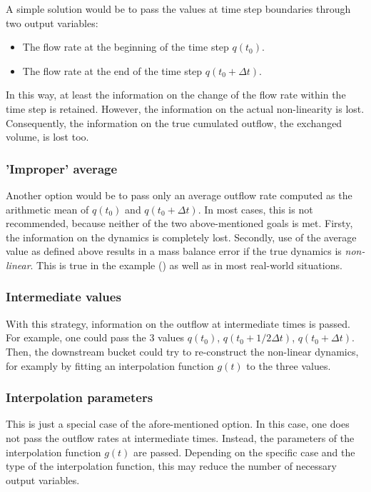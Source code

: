 A simple solution would be to pass the values at time step boundaries through two output variables:
\begin{itemize}
  \item The flow rate at the beginning of the time step $q(t_0)$.
  \item The flow rate at the end of the time step $q(t_0 + \Delta t)$.
\end{itemize}

In this way, at least the information on the change of the flow rate within the time step is retained. However, the information on the actual non-linearity is lost. Consequently, the information on the true cumulated outflow, \ie{} the exchanged volume, is lost too.

\subsubsection*{'Improper' average}

Another option would be to pass only an average outflow rate computed as the arithmetic mean of $q(t_0)$ and $q(t_0 + \Delta t)$. In most cases, this is not recommended, because neither of the two above-mentioned goals is met. Firsty, the information on the dynamics is completely lost. Secondly, use of the average value as defined above results in a mass balance error if the true dynamics is \emph{non-linear}. This is true in the example () as well as in most real-world situations.

\subsubsection*{Intermediate values}

With this strategy, information on the outflow at intermediate times is passed. For example, one could pass the 3 values $q(t_0)$, $q(t_0 + 1/2 \Delta t)$, $q(t_0 + \Delta t)$. Then, the downstream bucket could try to re-construct the non-linear dynamics, for examply by fitting an interpolation function $g(t)$ to the three values.

\subsubsection*{Interpolation parameters}

This is just a special case of the afore-mentioned option. In this case, one does not pass the outflow rates at intermediate times. Instead, the parameters of the interpolation function $g(t)$ are passed. Depending on the specific case and the type of the interpolation function, this may reduce the number of necessary output variables.

